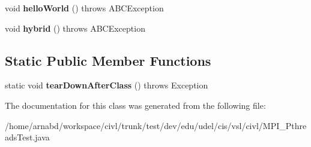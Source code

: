 \begin{DoxyCompactItemize}
\item 
\hypertarget{classedu_1_1udel_1_1cis_1_1vsl_1_1civl_1_1MPI__PthreadsTest_a4e27a98e12dd36ef80b7591e138383eb}{}void {\bfseries hello\+World} ()  throws A\+B\+C\+Exception \label{classedu_1_1udel_1_1cis_1_1vsl_1_1civl_1_1MPI__PthreadsTest_a4e27a98e12dd36ef80b7591e138383eb}

\item 
\hypertarget{classedu_1_1udel_1_1cis_1_1vsl_1_1civl_1_1MPI__PthreadsTest_ac35a6c28770055feecc2e267535cf93f}{}void {\bfseries hybrid} ()  throws A\+B\+C\+Exception \label{classedu_1_1udel_1_1cis_1_1vsl_1_1civl_1_1MPI__PthreadsTest_ac35a6c28770055feecc2e267535cf93f}

\end{DoxyCompactItemize}
\subsection*{Static Public Member Functions}
\begin{DoxyCompactItemize}
\item 
\hypertarget{classedu_1_1udel_1_1cis_1_1vsl_1_1civl_1_1MPI__PthreadsTest_ac130531a5a30534c6d19cca7e962aa28}{}static void {\bfseries tear\+Down\+After\+Class} ()  throws Exception \label{classedu_1_1udel_1_1cis_1_1vsl_1_1civl_1_1MPI__PthreadsTest_ac130531a5a30534c6d19cca7e962aa28}

\end{DoxyCompactItemize}


The documentation for this class was generated from the following file\+:\begin{DoxyCompactItemize}
\item 
/home/arnabd/workspace/civl/trunk/test/dev/edu/udel/cis/vsl/civl/M\+P\+I\+\_\+\+Pthreads\+Test.\+java\end{DoxyCompactItemize}
